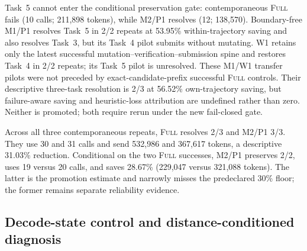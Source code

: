 \documentclass[11pt]{article}
\begin{document}
Task~5 cannot enter the conditional preservation gate: contemporaneous
\textsc{Full} fails (10 calls; 211,898 tokens), while M2/P1 resolves (12;
138,570).  Boundary-free M1/P1 resolves Task~5 in 2/2 repeats at 53.95\%
within-trajectory saving and also resolves Task~3, but its Task~4 pilot submits
without mutating.  W1 retains only the latest successful
mutation--verification--submission spine and restores Task~4 in 2/2 repeats;
its Task~5 pilot is unresolved.  These M1/W1 transfer pilots were not preceded
by exact-candidate-prefix successful \textsc{Full} controls.  Their descriptive
three-task resolution is 2/3 at 56.52\% own-trajectory saving, but
failure-aware saving and heuristic-loss attribution are undefined rather than
zero.  Neither is promoted; both require rerun under the new fail-closed gate.

Across all three contemporaneous repeats, \textsc{Full} resolves 2/3 and M2/P1
3/3.  They use 30 and 31 calls and send 532,986 and 367,617 tokens, a
descriptive 31.03\% reduction.  Conditional on the two \textsc{Full} successes,
M2/P1 preserves 2/2, uses 19 versus 20 calls, and saves 28.67\% (229,047 versus
321,088 tokens).  The latter is the promotion estimate and narrowly misses the
predeclared 30\% floor; the former remains separate reliability evidence.

\subsection{Decode-state control and distance-conditioned diagnosis}
\end{document}
